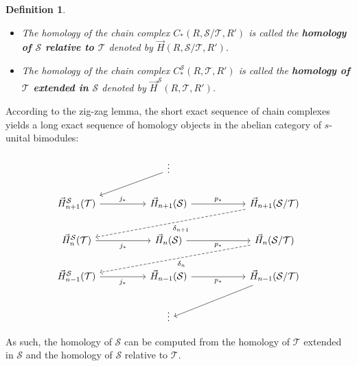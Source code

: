 \documentclass[a4paper,fleqn]{cas-sc}
\newtheorem{dfnt}{Definition}%
\newcommand{\G}{\Vec{H}}
\newcommand{\cS}{{\mathcal{S}}}
\newcommand{\cT}{{\mathcal{T}}}
\begin{document}
\begin{dfnt}
\begin{itemize}
    \item The homology of the chain complex $C_*(R, \cS/ \cT, R')$ is called the \textbf{homology of $\cS$ relative to $\cT$} denoted by $\G (R, \cS/ \cT, R')$.
    \item The homology of the chain complex $C^{\cS}_*(R,  \cT, R')$ is called the \textbf{homology of $\cT$ extended in $\cS$} denoted by $\G^{\cS} (R, \cT, R')$.
\end{itemize}
\end{dfnt}

According to 
the zig-zag lemma, the short exact sequence of chain complexes yields a long exact sequence of homology objects in the abelian category of $s$-unital bimodules:

\[\begin{tikzcd}
	&& \vdots \\
	\G^{\cS}_{n+1}(  \cT) && \G_{n+1}(\cS) &&  \G_{n+1}(\cS/ \cT) \\
	\G^{\cS}_n( \cT) && \G_{n}( \cS) &&  \G_n(\cS/ \cT)\\
	\G^{\cS}_{n-1}(  \cT) && \G_{n-1}(\cS) &&  \G_{n-1}(\cS/ \cT) \\
	&& \vdots & {}
	\arrow[from=1-3, to=2-1]
	\arrow["{j_*}", from=2-1, to=2-3]
	\arrow["{p_*}", from=2-3, to=2-5]
	\arrow[dashed, "{\delta_{n+1}}", from=2-5, to=3-1]
	\arrow["{j_*}"', from=3-1, to=3-3]
	\arrow["{p_*}"', from=3-3, to=3-5]
	\arrow[dashed, "{\delta_{n}}", from=3-5, to=4-1]
	\arrow["{j_*}"', from=4-1, to=4-3]
	\arrow["{p_*}"', from=4-3, to=4-5]
	\arrow[from=4-5, to=5-3]
\end{tikzcd}\]

As such, the homology of $\cS$ can be computed from the homology of $\cT$ extended in $\cS$ and the homology of $\cS$ relative to $\cT$.
\end{document}
